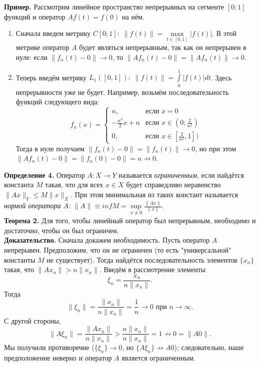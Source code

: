 \documentclass[12pt,a4paper, titlepage]{article}
\begin{document}
\textbf{Пример.} Рассмотрим линейное пространство непрерывных на сегменте $[0; 1]$ функций и оператор $A f(t) = f(0)$ на нём.
\begin{enumerate}
\item
Сначала введем метрику $C[0; 1]: \; \|f(t)\| = \max\limits_{t\in[0, 1]} |f(t)|$. В этой метрике оператор $A$ будет являться непрерывным, так как он непрерывен в нуле: если $\|f_n(t) - 0\| \to 0$, то $\|A f_n(t) - 0\| = \|Af_n(t)\| \to 0$.

\item
Теперь введём метрику $L_1([0, 1]): \; \|f(t)\| = \int\limits_0^1 |f(t)| dt$. Здесь непрерывности уже не будет. Например, возьмём последовательность функций следующего вида:
$$
f_n(x)=\begin{cases}
n, &\text{если $x = 0$} \\
- \frac {n^3} 2 x + n &\text{если $x \in (0; \frac 2 {n^2})$} \\
0, &\text{если $x \in [\frac 2 {n^2}, 1])$}
\end{cases}
$$
Тогда в нуле получаем $\|f_n(t) - 0 \| = \|f_n(t)\| \to 0$, но при этом $\|A f_n(t) - 0\| = \|f_n(0) - 0\| = n \not\to 0$.
\end{enumerate}

\textbf{Определение 4.} Оператор $A: X \to Y$ называется \textit{ограниченным}, если найдётся константа $M$ такая, что для всех $x \in X$ будет справедливо неравенство $\|Ax\|_Y \leqslant M \|x\|_X$. При этом минимальная из таких констант называется \textit{нормой оператора $A$}: $\|A\| \equiv inf M = \sup\limits_{x\neq0} \frac {\|Ax\|}{\|x\|}$.\\

\textbf{Теорема 2.} Для того, чтобы линейный оператор был непрерывным, необходимо и достаточно, чтобы он был ограничен.\\
\textbf{Доказательство.} Сначала докажем необходимость. Пусть оператор $A$ непрерывен. Предположим, что он не ограничен (то есть "универсальной" константы $M$ не существует). Тогда найдётся последовательность элементов $\lbrace x_n \rbrace$ такая, что $\|Ax_n\| > n \|x_n\|$. Введём в рассмотрение элементы
$$
\xi_n = \frac {x_n} {n \|x_n\|}.
$$
Тогда
$$
 \|\xi_n\| = \frac{\|x_n\|}{n \|x_n\|} = \frac 1 n \to 0 \text{ при } n \to \infty.
$$
С другой стороны,
$$
\|A\xi_n\| = \frac {\|Ax_n\|}{n\|x_n\|} > \frac {n\|x_n\|} {n\|x_n\|} = 1 \not\to 0 = \|A0\|.
$$
Мы получили противоречие ($\{\xi_n\} \to 0$, но $\{A\xi_n\} \not \to A0$); следовательно, наше предположение неверно и оператор $A$ является ограниченным.\\
\end{document}
